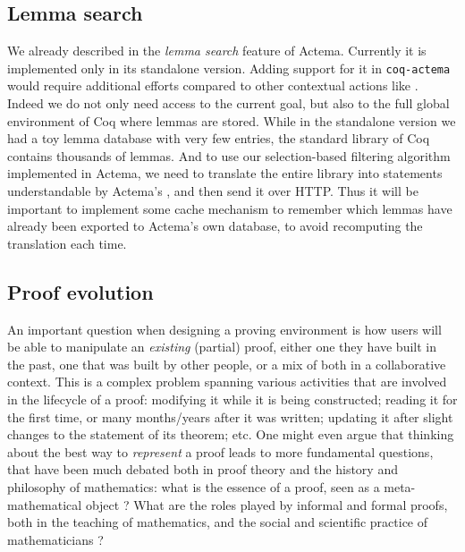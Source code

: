 \subsection{Lemma search}

We already described in  the \emph{lemma search} feature of
Actema. Currently it is implemented only in its standalone version. Adding
support for it in \texttt{coq-actema} would require additional efforts compared
to other contextual actions like . Indeed we do not only need
access to the current goal, but also to the full global environment of Coq where
lemmas are stored. While in the standalone version we had a toy lemma database
with very few entries, the standard library of Coq contains thousands of lemmas.
And to use our selection-based filtering algorithm implemented in Actema, we
need to translate the entire library into statements understandable by Actema's
, and then send it over HTTP. Thus it will be important to
implement some cache mechanism to remember which lemmas have already been
exported to Actema's own database, to avoid recomputing the translation each
time.



\subsection{Proof evolution}

An important question when designing a proving environment is how users will be
able to manipulate an \emph{existing} (partial) proof, either one they have
built in the past, one that was built by other people, or a mix of both in a
collaborative context. This is a complex problem spanning various activities
that are involved in the lifecycle of a proof: modifying it while it is being
constructed; reading it for the first time, or many months/years after it was
written; updating it after slight changes to the statement of its theorem;
etc. One might even argue
that thinking about the best way to \emph{represent} a proof leads to more
fundamental questions, that have been much debated both in proof theory and the
history and philosophy of mathematics: what is the essence of a proof, seen as a
meta-mathematical object ? What are the roles
played by informal and formal proofs, both in the teaching of mathematics, and
the social and scientific practice of mathematicians
\cite{bartzia_proof_nodate}?

